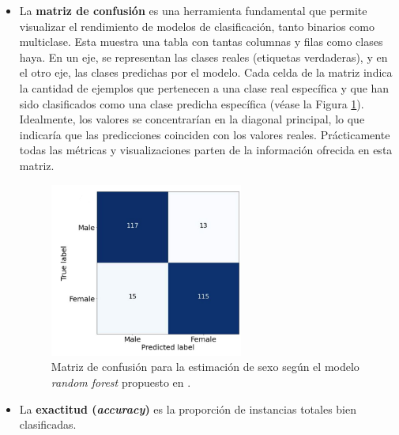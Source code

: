 \begin{itemize}

    \item La \textbf{matriz de confusión} es una herramienta fundamental que permite visualizar el rendimiento de modelos de clasificación, tanto binarios como multiclase. Esta muestra una tabla con tantas columnas y filas como clases haya. En un eje, se representan las clases reales (etiquetas verdaderas), y en el otro eje, las clases predichas por el modelo. Cada celda de la matriz indica la cantidad de ejemplos que pertenecen a una clase real específica y que han sido clasificados como una clase predicha específica (véase la Figura \ref{fig:conf_matrix_binary}). Idealmente, los valores se concentrarían en la diagonal principal, lo que indicaría que las predicciones coinciden con los valores reales. Prácticamente todas las métricas y visualizaciones parten de la información ofrecida en esta matriz. 

    \begin{figure}[htbp]
        \centering
        \includegraphics[width=0.6\textwidth]{capitulos/cap_02/imagenes/confusion_matrix_binary.png}
        \caption{
            Matriz de confusión para la estimación de sexo según el modelo \textit{random forest} propuesto en \cite{bidmos2023}.
        } 
        \label{fig:conf_matrix_binary}
    \end{figure}

    \item La \textbf{exactitud (\textit{accuracy})} es la proporción de instancias totales bien clasificadas. 
    
    

\end{itemize}
